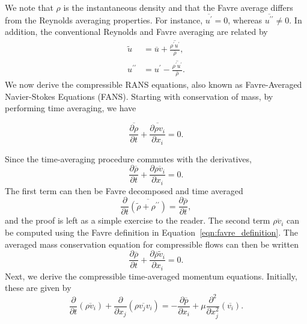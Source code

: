 We note that $\rho$ is the instantaneous density and that the Favre average differs from the Reynolds averaging properties. For instance, $\overline{u^\prime}=0$, whereas $\overline{u^{\prime\prime}}\neq0$. In addition, the conventional Reynolds and Favre averaging are related by
\begin{align}
    \tilde{u} & = \overline{u} + \overline{\frac{\rho^\prime u^\prime}{\overline \rho}}, \\
    u^{\prime\prime} & = u^\prime - \overline{\frac{\rho^\prime u^\prime}{\overline \rho}}.
\end{align}
We now derive the compressible RANS equations, also known as Favre-Averaged Navier-Stokes Equations (FANS). Starting with conservation of mass, by performing time averaging, we have
\begin{eqBox}
\begin{equation}
    \overline{\frac{\partial\rho}{\partial t}} + \overline{\frac{\partial \rho v_i}{\partial x_i}}= 0.
\end{equation}
\end{eqBox}
Since the time-averaging procedure commutes with the derivatives,
\begin{equation}
    \frac{\partial\overline{\rho}}{\partial t} + \frac{\partial \overline{\rho v_i}}{\partial x_i}= 0.
\end{equation}
The first term can then be Favre decomposed and time averaged
\begin{equation}
    \frac{\partial}{\partial t} \overline{\left(\tilde \rho + \rho^{\prime\prime} \right)} 
    = \frac{\partial \overline \rho}{\partial t},
    \label{eqn:favre_singlevariable}
\end{equation}
and the proof is left as a simple exercise to the reader. The second term $\overline{\rho v_i}$ can be computed using the Favre definition in Equation~\ref{eqn:favre_definition}. The averaged mass conservation equation for compressible flows can then be written
\begin{equation}
    \frac{\partial\overline{\rho}}{\partial t} + \frac{\partial \overline{\rho} \tilde v_i}{\partial x_i}= 0.
\end{equation}
Next, we derive the compressible time-averaged momentum equations. Initially, these are given by 
\begin{equation}
    \frac{\partial }{\partial t} \left(\overline{\rho v_i}\right)
    + \frac{\partial}{\partial x_j} \left(\overline{\rho v_j v_i}\right)
    =- \frac{\partial \overline{p}}{\partial x_i} 
    + \mu \frac{\partial^2 }{\partial x_j^2} \left(\overline{v_i}\right).
\end{equation}
